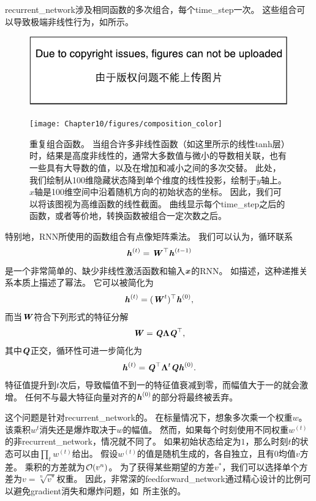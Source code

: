 \gls{recurrent_network}涉及相同函数的多次组合，每个\gls{time_step}一次。
这些组合可以导致极端非线性行为，如所示。
\begin{figure}[!htb]
\ifOpenSource
\centerline{\includegraphics{figure.pdf}}
\else
\centerline{\texttt{[image: Chapter10/figures/composition\_color]}}
\fi
\caption{重复组合函数。
当组合许多非线性函数（如这里所示的线性tanh层）时，结果是高度非线性的，通常大多数值与微小的导数相关联，也有一些具有大导数的值，以及在增加和减小之间的多次交替。%
此处，我们绘制从100维隐藏状态降到单个维度的线性投影，绘制于$y$轴上。
$x$轴是100维空间中沿着随机方向的初始状态的坐标。
因此，我们可以将该图视为高维函数的线性截面。
曲线显示每个\gls{time_step}之后的函数，或者等价地，转换函数被组合一定次数之后。
}
\label{fig:chap10_composition_color}
\end{figure}

特别地，\gls{RNN}所使用的函数组合有点像矩阵乘法。
我们可以认为，循环联系
\begin{align}
 \boldsymbol{\mathit{h}}^{(t)} = \boldsymbol{\mathit{W}}^\top \boldsymbol{\mathit{h}}^{(t-1)}
\end{align}
是一个非常简单的、缺少非线性激活函数和输入$\boldsymbol{\mathit{x}}$的\gls{RNN}。
如描述，这种递推关系本质上描述了幂法。
它可以被简化为
\begin{align}
 \boldsymbol{\mathit{h}}^{(t)} = (\boldsymbol{\mathit{W}}^t)^\top \boldsymbol{\mathit{h}}^{(0)},
\end{align}
而当$\boldsymbol{\mathit{W}}$符合下列形式的特征分解
\begin{align}
 \boldsymbol{\mathit{W}} = \boldsymbol{\mathit{Q}} \boldsymbol{\Lambda} \boldsymbol{\mathit{Q}}^\top,
\end{align}
其中$\boldsymbol{\mathit{Q}}$正交，循环性可进一步简化为
\begin{align}
 \boldsymbol{\mathit{h}}^{(t)} = \boldsymbol{\mathit{Q}}^\top \boldsymbol{\Lambda}^t \boldsymbol{\mathit{Q}} \boldsymbol{\mathit{h}}^{(0)}.
\end{align}
特征值提升到$t$次后，导致幅值不到一的特征值衰减到零，而幅值大于一的就会激增。
任何不与最大特征向量对齐的$\boldsymbol{\mathit{h}}^{(0)}$的部分将最终被丢弃。


这个问题是针对\gls{recurrent_network}的。
在标量情况下，想象多次乘一个权重$w$。
该乘积$w^t$消失还是爆炸取决于$w$的幅值。
然而，如果每个时刻使用不同权重$w^{(t)}$的非\gls{recurrent_network}，情况就不同了。
如果初始状态给定为$1$，那么时刻$t$的状态可以由$\prod_t w^{(t)}$给出。
假设$w^{(t)}$的值是随机生成的，各自独立，且有$0$均值$v$方差。
乘积的方差就为$\mathcal{O}(v^n)$。
为了获得某些期望的方差$v^*$，我们可以选择单个方差为$v=\sqrt[n]{v^*}$权重。
因此，非常深的\gls{feedforward_network}通过精心设计的比例可以避免\gls{gradient}消失和爆炸问题，如~\cite{Sussillo14}所主张的。

